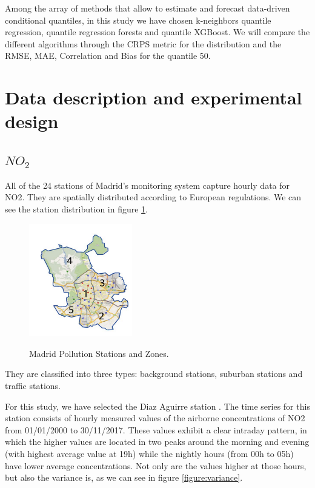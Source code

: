 \documentclass[a4paper,twocolumn,5p]{elsarticle}
\begin{document}
Among the array of methods that allow to estimate and forecast
data-driven conditional quantiles, in this study we have chosen
k-neighbors quantile regression, quantile regression forests and quantile XGBoost. 
We will compare the different algorithms through the CRPS metric for the 
distribution and the RMSE, MAE, Correlation and Bias for the quantile 50.

\section{Data description and experimental design}

\subsection{$NO_2$}
\label{sec:no2}
All of the 24 stations of Madrid’s monitoring system capture hourly data for NO2. 
They are spatially distributed according to European regulations.
We can see the station distribution in figure \ref{figure:stations}.

\begin{figure}
  \caption{Madrid Pollution Stations and Zones.}
  \centering
      \includegraphics[width=0.4\textwidth]{zonas_madrid}
      \label{figure:stations}
\end{figure} 

They are classified into 
three types: background stations, suburban stations 
and traffic stations. 

For this study, we have selected the Diaz Aguirre station .
The time series for this station consists of hourly
measured values of the airborne concentrations of NO2
from 01/01/2000 to 30/11/2017. These values exhibit a clear intraday 
pattern, in which the
higher values are located in two peaks around the morning
and evening (with highest average value at 19h) while the 
nightly hours (from 00h to 05h) have lower average concentrations. 
Not only are the values higher at those hours, but also
the variance is, as we can see in figure \ref{figure:variance}. 
\end{document}
